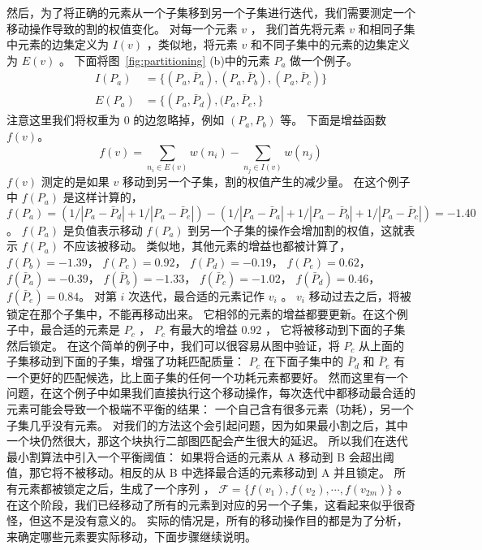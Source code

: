   然后，为了将正确的元素从一个子集移到另一个子集进行迭代，我们需要测定一个移动操作导致的割的权值变化。
  对每一个元素 $v$ ， 我们首先将元素 $v$ 和相同子集中元素的边集定义为 $I(v)$ ，类似地，将元素 $v$ 和不同子集中的元素的边集定义为 $E(v)$ 。
  下面将图~\ref{fig:partitioning} (b)中的元素 $P_a$ 做一个例子。
  \begin{equation}
  \begin{split}
  I(P_a) &= \{(P_a,\bar{P}_a), (P_a, \bar{P}_b), (P_a, \bar{P}_c)\}\\
  E(P_a) &= \{(P_a, \bar{P}_d), (P_a, \bar{P}_e, \}
  \end{split}
  \end{equation}
  注意这里我们将权重为 $0$ 的边忽略掉，例如 $(P_a, P_b)$ 等。
  下面是增益函数 $f(v)$。
  \begin{equation}
  f(v) = \sum_{n_i \in E(v)}{w(n_i )} - \sum_{n_j \in I(v)}{w(n_j )}
  \end{equation}
  $f(v)$ 测定的是如果 $v$ 移动到另一个子集，割的权值产生的减少量。
  在这个例子中 $f(P_a)$ 是这样计算的， $f(P_a) =
  (1/|P_a-\bar{P}_d|+1/|P_a-\bar{P}_e|)-(1/|P_a-\bar{P}_a|+1/|P_a-\bar{P}_b|+1/|P_a-\bar{P}_c|)=-1.40$。
  $f(P_a)$ 是负值表示移动 $f(P_a)$ 到另一个子集的操作会增加割的权值，这就表示 $f(P_a)$ 不应该被移动。
  类似地，其他元素的增益也都被计算了， $f(P_b)=-1.39$， $f(P_c) = 0.92$， $f(P_d) = -0.19$，
  $f(P_e)=0.62$， $f(\bar{P}_a) = -0.39$， $f(\bar{P}_b)=-1.33$，
  $f(\bar{P}_c)=-1.02$， $f(\bar{P}_d) = 0.46$， $f(\bar{P}_e) = 0.84$。
  对第 $i$ 次迭代，最合适的元素记作 $v_i$ 。  $v_i$ 移动过去之后，将被锁定在那个子集中，不能再移动出来。
  它相邻的元素的增益都要更新。在这个例子中，最合适的元素是 $P_c$ ， $P_c$ 有最大的增益 $0.92$ ，
  它将被移动到下面的子集然后锁定。
  在这个简单的例子中，我们可以很容易从图中验证，将 $P_c$ 从上面的子集移动到下面的子集，增强了功耗匹配质量：
$P_c$ 在下面子集中的 $\bar{P}_d$ 和 $\bar{P}_e$ 有一个更好的匹配候选，比上面子集的任何一个功耗元素都要好。
然而这里有一个问题，在这个例子中如果我们直接执行这个移动操作，每次迭代中都移动最合适的元素可能会导致一个极端不平衡的结果：
一个自己含有很多元素（功耗），另一个子集几乎没有元素。
对我们的方法这个会引起问题，因为如果最小割之后，其中一个块仍然很大，那这个块执行二部图匹配会产生很大的延迟。
所以我们在迭代最小割算法中引入一个平衡阈值：
如果将合适的元素从 A 移动到 B 会超出阈值，那它将不被移动。相反的从 B 中选择最合适的元素移动到 A 并且锁定。
所有元素都被锁定之后，生成了一个序列 ， $\mathcal{F} = \{f(v_1), f(v_2), \cdots, f(v_{2m})\}$ 。
在这个阶段，我们已经移动了所有的元素到对应的另一个子集，这看起来似乎很奇怪，但这不是没有意义的。
实际的情况是，所有的移动操作目的都是为了分析，来确定哪些元素要实际移动，下面步骤继续说明。


